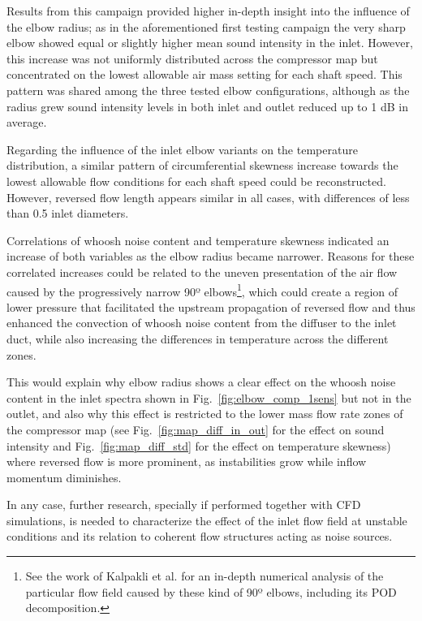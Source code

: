 Results from this campaign provided higher in-depth insight into the influence of the elbow radius; as in the aforementioned first testing campaign the very sharp elbow showed equal or slightly higher mean sound intensity in the inlet. However, this increase was not uniformly distributed across the compressor map but concentrated on the lowest allowable air mass setting for each shaft speed. This pattern was shared among the three tested elbow configurations, although as the radius grew sound intensity levels in both inlet and outlet reduced up to 1 dB in average.

Regarding the influence of the inlet elbow variants on the temperature distribution, a similar pattern of circumferential skewness increase towards the lowest allowable flow conditions for each shaft speed could be reconstructed. However, reversed flow length appears similar in all cases, with differences of less than 0.5 inlet diameters.

Correlations of whoosh noise content and temperature skewness indicated an increase of both variables as the elbow radius became narrower. Reasons for these correlated increases could be related to the uneven presentation of the air flow caused by the progressively narrow 90º elbows\footnote{See the work of Kalpakli et al. \cite{kalpakli2013vortical,kalpakli2013turbulent} for an in-depth numerical analysis of the particular flow field caused by these kind of 90º elbows, including its POD decomposition.}, which could create a region of lower pressure that facilitated the upstream propagation of reversed flow and thus enhanced the convection of whoosh noise content from the diffuser to the inlet duct, while also increasing the differences in temperature across the different zones.

This would explain why elbow radius shows a clear effect on the whoosh noise content in the inlet spectra shown in Fig.~\ref{fig:elbow_comp_1sens} but not in the outlet, and also why this effect is restricted to the lower mass flow rate zones of the compressor map (see Fig.~\ref{fig:map_diff_in_out} for the effect on sound intensity and Fig.~\ref{fig:map_diff_std} for the effect on temperature skewness) where reversed flow is more prominent, as instabilities grow while inflow momentum diminishes. 

In any case, further research, specially if performed together with CFD simulations, is needed to characterize the effect of the inlet flow field at unstable conditions and its relation to coherent flow structures acting as noise sources.

